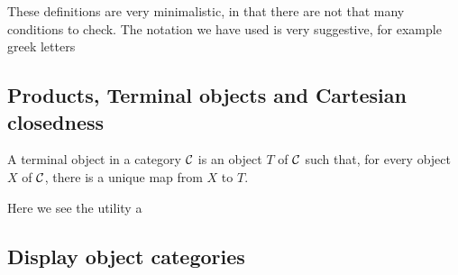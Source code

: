 \begin{defin}
    These definitions are very minimalistic, in that there are not that many conditions to check. The notation we have used is very suggestive, for example greek letters 
\end{defin}

\subsection{Products, Terminal objects and Cartesian closedness}

\begin{defin}
    A terminal object in a category $\mathcal{C}$ is an object $T$ of $\mathcal{C}$ such that, for every object $X$ of $\mathcal{C}$, there is a unique map from $X$ to $T$.
\end{defin}

Here we see the utility a

\subsection{Display object categories}

